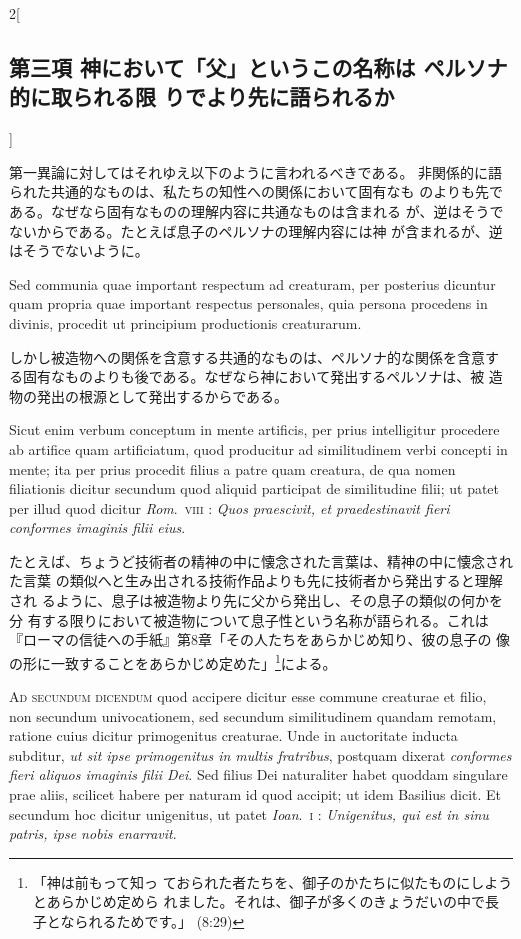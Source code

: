 \documentclass[paper=a4paper,fontsize=10pt,jafontsize=9pt,titlepage]{jlreq}
\begin{document}
\begin{paracol}{2}[\subsection{第三項 神において「父」というこの名称は ペルソナ的に取られる限 りでより先に語られるか}]
\switchcolumn


第一異論に対してはそれゆえ以下のように言われるべきである。
非関係的に語られた共通的なものは、私たちの知性への関係において固有なも
 のよりも先である。なぜなら固有なものの理解内容に共通なものは含まれる
 が、逆はそうでないからである。たとえば息子のペルソナの理解内容には神
 が含まれるが、逆はそうでないように。


\switchcolumn*


Sed communia quae
important respectum ad creaturam, per posterius dicuntur quam propria
quae important respectus personales, quia persona procedens in
divinis, procedit ut principium productionis creaturarum.


\switchcolumn


しかし被造物への関係を含意する共通的なものは、ペルソナ的な関係を含意す
 る固有なものよりも後である。なぜなら神において発出するペルソナは、被
 造物の発出の根源として発出するからである。


\switchcolumn*


Sicut enim
verbum conceptum in mente artificis, per prius intelligitur procedere
ab artifice quam artificiatum, quod producitur ad similitudinem verbi
concepti in mente; ita per prius procedit filius a patre quam
creatura, de qua nomen filiationis dicitur secundum quod aliquid
participat de similitudine filii; ut patet per illud quod dicitur
{\itshape Rom}.~{\scshape viii} : {\itshape Quos praescivit, et praedestinavit fieri conformes imaginis
filii eius}.


\switchcolumn


たとえば、ちょうど技術者の精神の中に懐念された言葉は、精神の中に懐念された言葉
 の類似へと生み出される技術作品よりも先に技術者から発出すると理解され
 るように、息子は被造物より先に父から発出し、その息子の類似の何かを分
 有する限りにおいて被造物について息子性という名称が語られる。これは
 『ローマの信徒への手紙』第8章「その人たちをあらかじめ知り、彼の息子の
 像の形に一致することをあらかじめ定めた」\footnote{「神は前もって知っ
 ておられた者たちを、御子のかたちに似たものにしようとあらかじめ定めら
 れました。それは、御子が多くのきょうだいの中で長子となられるためです。」
 (8:29)}による。


\switchcolumn*[\subsection{ad.2}]


{\scshape Ad secundum dicendum} quod accipere dicitur esse commune creaturae et
filio, non secundum univocationem, sed secundum similitudinem quandam
remotam, ratione cuius dicitur primogenitus creaturae. Unde in
auctoritate inducta subditur, {\itshape ut sit ipse primogenitus in multis
fratribus}, postquam dixerat {\itshape conformes fieri aliquos imaginis filii
Dei}. Sed filius Dei naturaliter habet quoddam singulare prae aliis,
scilicet habere per naturam id quod accipit; ut idem Basilius
dicit. Et secundum hoc dicitur unigenitus, ut patet {\itshape
 Ioan}.~{\scshape i} : {\itshape Unigenitus, qui est in sinu patris, ipse nobis enarravit}.



\end{paracol}
\end{document}
